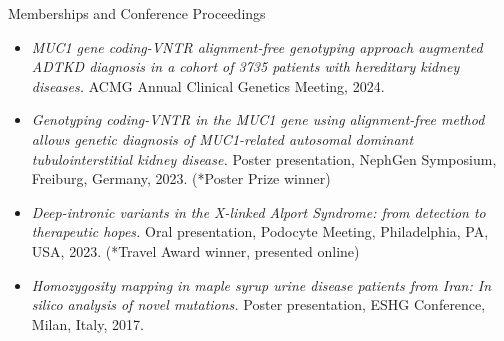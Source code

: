 \documentclass[
	11pt, %
]{resume} %
\begin{document}
\begin{rSection}{Memberships and Conference Proceedings}
\begin{itemize}
  \item \textit{MUC1 gene coding-VNTR alignment-free genotyping approach augmented ADTKD diagnosis in a cohort of 3735 patients with hereditary kidney diseases.} ACMG Annual Clinical Genetics Meeting, 2024.
  \item \textit{Genotyping coding-VNTR in the MUC1 gene using alignment-free method allows genetic diagnosis of MUC1-related autosomal dominant tubulointerstitial kidney disease.} Poster presentation, NephGen Symposium, Freiburg, Germany, 2023. (*Poster Prize winner)
  \item \textit{Deep-intronic variants in the X-linked Alport Syndrome: from detection to therapeutic hopes.} Oral presentation, Podocyte Meeting, Philadelphia, PA, USA, 2023. (*Travel Award winner, presented online)
  \item \textit{Homozygosity mapping in maple syrup urine disease patients from Iran: In silico analysis of novel mutations.} Poster presentation, ESHG Conference, Milan, Italy, 2017.
\end{itemize}
\end{rSection}

\end{document}
